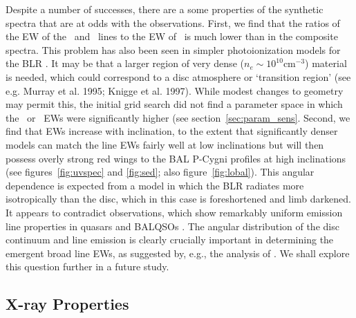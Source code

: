 \documentclass[useAMS,usenatbib]{mn2e_x}
\begin{document}

Despite a number of successes, 
there are a some properties of the synthetic spectra
that are at odds with the observations. First, we find that the ratios of the 
EW of the \la\ and \mgline\ lines
to the EW of \civline\ is much lower than in the composite spectra. 
This problem has also been seen in simpler photoionization models for the 
BLR \citep{netzer1990}.
It may be that a larger region of very dense ($n_e\sim10^{10}$cm$^{-3}$) 
material is needed, which could correspond to a disc atmosphere or 
`transition region' (see e.g. Murray et al. 1995; Knigge et al. 1997).
\nocite{knigge1998} 
While modest changes to geometry may permit this, the initial grid search 
did not find a parameter space in which the \la\ or \mg\ EWs
were significantly higher (see section~\ref{sec:param_sens}. 
Second, we find that EWs increase
with inclination, to the extent that significantly denser
models can match the line EWs fairly well at low inclinations but will then
possess overly strong red wings to the BAL P-Cygni profiles at high inclinations
(see figures~\ref{fig:uvspec} and \ref{fig:sed}; also figure~\ref{fig:lobal}).
This angular dependence is expected from a model in which the BLR radiates
more isotropically than the disc, which in this case is foreshortened and limb darkened.
It appears to contradict observations, which show remarkably uniform emission
line properties in quasars and BALQSOs \citep{weymann1991,dipompeo2012b}. 
The angular distribution of the disc 
continuum and line emission
is clearly crucially important in determining the emergent broad 
line EWs, as suggested by, e.g., the analysis of \cite{risaliti2011}. 
We shall explore this question further in a future study.  


\subsection{X-ray Properties}
\label{sec:xray}
\end{document}
